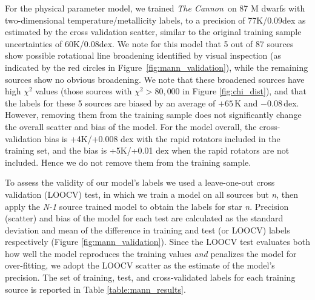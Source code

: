 \documentclass[twocolumn]{aastex62}
\newcommand{\thecannon}{\textsl{The Cannon}}
\begin{document}
For the physical parameter model, we trained \thecannon\ on 87 M dwarfs with two-dimensional temperature/metallicity labels, to a precision of 77K/0.09dex as estimated by the cross validation scatter, similar to the original training sample uncertainties of 60K/0.08dex. We note for this model that 5 out of 87 sources show possible rotational line broadening identified by visual inspection (as indicated by the red circles in Figure~\ref{fig:mann_validation}), while the remaining sources show no obvious broadening. We note that these broadened sources have high $\chi^2$ values (those sources with $\chi^2 > 80,000$ in Figure \ref{fig:chi_dist}), and that the labels for these 5 sources are biased by an average of $+65\,$K and $-0.08\,$dex. However, removing them from the training sample does not significantly change the overall scatter and bias of the model. For the model overall, the cross-validation bias is +4K/+0.008 dex with the rapid rotators included in the training set, and the bias is +5K/+0.01 dex when the rapid rotators are not included. Hence we do not remove them from the training sample.

To assess the validity of our model's labels we used a leave-one-out cross validation (LOOCV) test, in which we train a model on all sources but \emph{n}, then apply the \emph{N-1} source trained model to obtain the labels for star \emph{n}. Precision (scatter) and bias of the model for each test are calculated as the standard deviation and mean of the difference in training and test (or LOOCV) labels respectively (Figure \ref{fig:mann_validation}). Since the LOOCV test evaluates both how well the model reproduces the training values \emph{and} penalizes the model for over-fitting, we adopt the LOOCV scatter as the estimate of the model's precision. The set of training, test, and cross-validated labels for each training source is reported in Table \ref{table:mann_results}.
\end{document}
